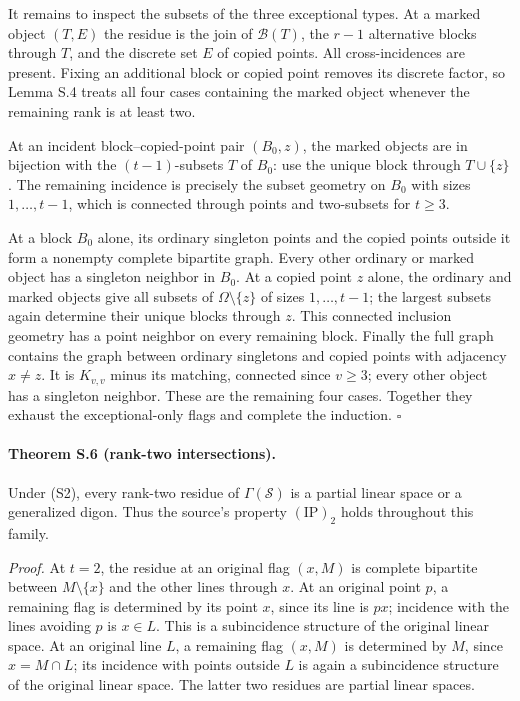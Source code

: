 It remains to inspect the subsets of the three exceptional types.
At a marked object $(T,E)$ the residue is the join of
$\mathcal B(T)$, the $r-1$ alternative blocks through $T$, and
the discrete set $E$ of copied points. All cross-incidences are
present. Fixing an additional block or copied point removes its
discrete factor, so Lemma S.4 treats all four cases containing the
marked object whenever the remaining rank is at least two.

At an incident block--copied-point pair $(B_0,z)$, the marked objects
are in bijection with the $(t-1)$-subsets $T$ of $B_0$: use the unique
block through $T\cup\{z\}$. The remaining incidence is precisely
the subset geometry on $B_0$ with sizes $1,\ldots,t-1$, which is
connected through points and two-subsets for $t\geq3$.

At a block $B_0$ alone, its ordinary singleton points and the copied
points outside it form a nonempty complete bipartite graph. Every
other ordinary or marked object has a singleton neighbor in $B_0$.
At a copied point $z$ alone, the ordinary and marked objects give
all subsets of $\Omega\setminus\{z\}$ of sizes $1,\ldots,t-1$;
the largest subsets again determine their unique blocks through $z$.
This connected inclusion geometry has a point neighbor on every
remaining block. Finally the full graph contains the graph between
ordinary singletons and copied points with adjacency $x\ne z$.
It is $K_{v,v}$ minus its matching, connected since $v\geq3$;
every other object has a singleton neighbor. These are the remaining
four cases. Together they exhaust the exceptional-only flags and
complete the induction. \hfill$\square$

\paragraph{Theorem S.6 (rank-two intersections).}
Under (S2), every rank-two residue of $\Gamma(\mathcal S)$ is a
partial linear space or a generalized digon. Thus the source's
property $(\mathrm{IP})_2$ holds throughout this family.

\emph{Proof.}
At $t=2$, the residue at an original flag $(x,M)$ is complete
bipartite between $M\setminus\{x\}$ and the other lines through
$x$. At an original point $p$, a remaining flag is determined by
its point $x$, since its line is $px$; incidence with the lines
avoiding $p$ is $x\in L$. This is a subincidence structure of the
original linear space. At an original line $L$, a remaining flag
$(x,M)$ is determined by $M$, since $x=M\cap L$; its incidence
with points outside $L$ is again a subincidence structure of the
original linear space. The latter two residues are partial linear
spaces.

